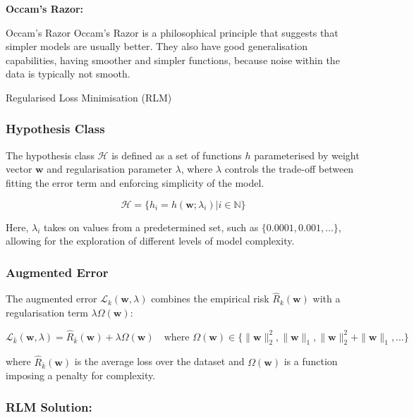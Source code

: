 \textbf{Occam's Razor:}

\begin{definitionbox}{Occam's Razor}
Occam's Razor is a philosophical principle that suggests that simpler models are usually better. They also have good generalisation capabilities, having smoother and simpler functions, because noise within the data is typically not smooth.

\end{definitionbox}

\begin{definitionbox}{Regularised Loss Minimisation (RLM)}
\subsubsection*{Hypothesis Class}

The hypothesis class \( \mathcal{H} \) is defined as a set of functions \( h \) parameterised by weight vector \( \mathbf{w} \) and regularisation parameter \( \lambda \), where \( \lambda \) controls the trade-off between fitting the error term and enforcing simplicity of the model.

\[
\mathcal{H} = \{ h_i = h(\mathbf{w}; \lambda_i) | i \in \mathbb{N} \}
\]

Here, \( \lambda_i \) takes on values from a predetermined set, such as \( \{0.0001, 0.001, \ldots\} \), allowing for the exploration of different levels of model complexity.

\subsubsection*{Augmented Error}

The augmented error \( \mathcal{L}_k(\mathbf{w}, \lambda) \) combines the empirical risk \( \hat{R}_k(\mathbf{w}) \) with a regularisation term \( \lambda\Omega(\mathbf{w}) \):

\[
\mathcal{L}_{\bar{k}}(\mathbf{w}, \lambda) = \hat{R}_{\bar{k}}(\mathbf{w}) + \lambda\Omega(\mathbf{w})\quad  \text{where }\Omega(\mathbf{w})\in\{\|\mathbf{w}\|_2^2,\|\mathbf{w}\|_1,\|\mathbf{w}\|_2^2+\|\mathbf{w}\|_1,\ldots\}
\]

where \( \hat{R}_{\bar{k}}(\mathbf{w}) \) is the average loss over the dataset and \( \Omega(\mathbf{w}) \) is a function imposing a penalty for complexity. 


\subsubsection*{RLM Solution:}


\end{definitionbox}
